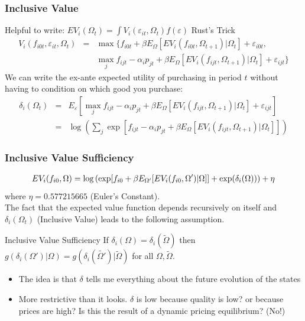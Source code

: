 \documentclass[xcolor=pdftex,dvipsnames,table,mathserif,aspectratio=169]{beamer}
\begin{document}
\begin{frame}
\frametitle{Inclusive Value}
 Helpful to write: $EV_i(\Omega_t)= \int V_i(\varepsilon_{it},  \Omega_t)f(\varepsilon)$ \alert{Rust's Trick}
\begin{eqnarray*}
V_i(f_{i0t},\varepsilon_{i t}, \Omega_t) &=& \max \{ f_{i0t} + \beta E_{\Omega}[ EV_i (f_{i0t}, \Omega_{t+1}) |\Omega_{t} ] + \varepsilon_{i0t},\\
&& \max_j f_{ijt}  -\alpha_i p_{jt} + \beta E_{\Omega}[ E V_i (f_{ijt}, \Omega_{t+1}) |\Omega_{t}] + \varepsilon_{ijt}  \}
\end{eqnarray*}
We can write the \alert{ex-ante} expected utility of purchasing in period $t$ without having to condition on which good you purchase:
\begin{eqnarray*} 
\delta_{i}(\Omega_t) &=& E_{\varepsilon} [ \max_j f_{ijt}  -\alpha_i p_{jt} + \beta E_{\Omega}[ E V_i (f_{ijt}, \Omega_{t+1}) |\Omega_{t}] + \varepsilon_{ijt}]  \\
&=& \log \left( \sum_j \exp[ f_{ijt}  -\alpha_i p_{jt} + \beta E_{\Omega}[ E V_i (f_{ijt}, \Omega_{t+1}) |\Omega_{t}] ]  \right)
\end{eqnarray*}
\end{frame}

\begin{frame}
\frametitle{Inclusive Value Sufficiency}
\begin{eqnarray*}
\small EV_i(f_{i0}, \Omega) = \log\left( \exp[ f_{i0} + \beta E_{\Omega'}[ EV_i (f_{i0}, \Omega') |\Omega]] + \exp(\delta_i(\Omega))  \right) + \eta
\end{eqnarray*}
\footnotesize 
\alert{where $\eta = 0.577215665$ (Euler's Constant).}\\
\normalsize
The fact that the expected value function depends recursively on itself and $\delta_{i}(\Omega_t)$ (Inclusive Value) leads to the following assumption.
\begin{block}{Inclusive Value Sufficiency}
If $\delta_i(\Omega) = \delta_i(\tilde{\Omega})$ then $g(\delta_i(\Omega') | \Omega)= g(\delta_i(\tilde{\Omega'}) | \tilde{\Omega})$ for all $\Omega,\tilde{\Omega}$.
\end{block}
\begin{itemize}
\item The idea is that $\delta$ tells me everything about the future evolution of the states
\item More restrictive than it looks.  $\delta$ is low because quality is low? or because prices are high? Is this the result of a dynamic pricing equilibrium? (No!)
\end{itemize}
\end{frame}
\end{document}
